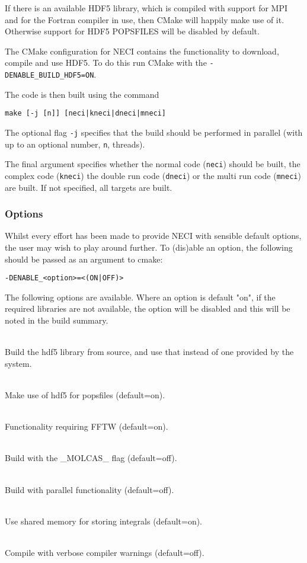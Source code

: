 \documentclass[a4paper,notitlepage,dvipsnames]{scrreprt}
\newcommand\codeitem[1]{\needspace{1.5\baselineskip}\item[\textnormal{\ttfamily #1 \nopagebreak}] \hfill \\ \nopagebreak}
\let\code\lstinline
\begin{document}
	\begin{mdframed}[ %
		linewidth = 2pt, %
		linecolor = red, %
		roundcorner = 6pt, %
		leftmargin = 10, %
		rightmargin = 10, %
		backgroundcolor = gray!20
	]
	If there is an available HDF5 library, which is compiled with support for
	MPI and for the Fortran compiler in use, then CMake will happily make use
	of it. Otherwise support for HDF5 POPSFILES will be disabled by default.

	The CMake configuration for NECI contains the functionality to download,
	compile and use HDF5. To do this run CMake with the
    \code{-DENABLE_BUILD_HDF5=ON}.
	\end{mdframed}

	The code is then built using the command
	\begin{lstlisting}[gobble=4]
		make [-j [n]] [neci|kneci|dneci|mneci]
	\end{lstlisting}
	The optional flag \code{-j} specifies that the build should be
	performed in parallel (with up to an optional number, \code{n},
	threads).

	The final argument specifies whether the normal code (\code{neci})
	should be built, the complex code (\code{kneci}) the double run
	code (\code{dneci}) or the multi run code (\code{mneci}) are
	built. If not specified, all targets are built.

\subsubsection{Options}
    Whilst every effort has been made to provide NECI with sensible default options, the user
    may wish to play around further. To (dis)able an option, the following should be passed as
    an argument to cmake:
    \begin{lstlisting}[gobble=4]
        -DENABLE_<option>=<(ON|OFF)>
    \end{lstlisting}
    The following options are available. Where an option is default "on", if the required libraries
    are not available, the option will be disabled and this will be noted in the build summary.
    \begin{description}
        \codeitem{BUILD\_HDF5}
            Build the hdf5 library from source, and use that instead of one provided by the system.
        \codeitem{HDF5}
            Make use of hdf5 for popsfiles (default=on).
        \codeitem{FFTW}
            Functionality requiring FFTW (default=on).
        \codeitem{MOLCAS}
            Build with the \_MOLCAS\_ flag (default=off).
        \codeitem{MPI}
            Build with parallel functionality (default=off).
        \codeitem{SHARED\_MEMORY}
            Use shared memory for storing integrals (default=on).
        \codeitem{WARNINGS}
            Compile with verbose compiler warnings (default=off).
    \end{description}
\end{document}
